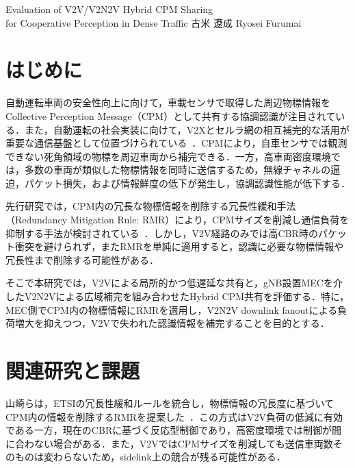 \documentclass[a4paper,10pt,twocolumn,uplatex]{jsarticle}
\date{4}
\begin{document}
{Evaluation of V2V/V2N2V Hybrid CPM Sharing
\\for Cooperative Perception in Dense Traffic}
{古米 遼成}
{Ryosei Furumai}

\section{はじめに}
自動運転車両の安全性向上に向けて，車載センサで取得した周辺物標情報をCollective Perception Message（CPM）として共有する協調認識が注目されている．また，自動運転の社会実装に向けて，V2Xとセルラ網の相互補完的な活用が重要な通信基盤として位置づけられている~\cite{digital_lifeline}．CPMにより，自車センサでは観測できない死角領域の物標を周辺車両から補完できる．一方，高車両密度環境では，多数の車両が類似した物標情報を同時に送信するため，無線チャネルの逼迫，パケット損失，および情報鮮度の低下が発生し，協調認識性能が低下する．

先行研究では，CPM内の冗長な物標情報を削除する冗長性緩和手法（Redundancy Mitigation Rule: RMR）により，CPMサイズを削減し通信負荷を抑制する手法が検討されている~\cite{yamasaki2023,delooz}．しかし，V2V経路のみでは高CBR時のパケット衝突を避けられず，またRMRを単純に適用すると，認識に必要な物標情報や冗長性まで削除する可能性がある．

そこで本研究では，V2Vによる局所的かつ低遅延な共有と，gNB設置MECを介したV2N2Vによる広域補完を組み合わせたHybrid CPM共有を評価する．特に，MEC側でCPM内の物標情報にRMRを適用し，V2N2V downlink fanoutによる負荷増大を抑えつつ，V2Vで失われた認識情報を補完することを目的とする．

\section{関連研究と課題}
山崎らは，ETSIの冗長性緩和ルールを統合し，物標情報の冗長度に基づいてCPM内の情報を削除するRMRを提案した~\cite{yamasaki2023}．この方式はV2V負荷の低減に有効である一方，現在のCBRに基づく反応型制御であり，高密度環境では制御が間に合わない場合がある．また，V2VではCPMサイズを削減しても送信車両数そのものは変わらないため，sidelink上の競合が残る可能性がある．
\end{document}
